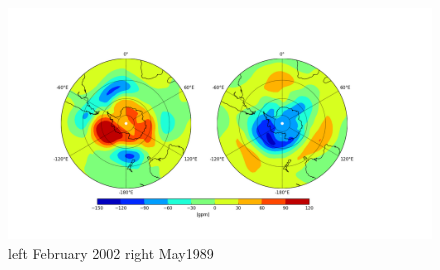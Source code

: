 \begin{figure}
		\centering
		\includegraphics[scale=0.4]{pictures/SAM_low_high.png}
		\caption{left February 2002 right May1989}\label{fig:SAM_low_high}
		
\end{figure}	
	
	
	
